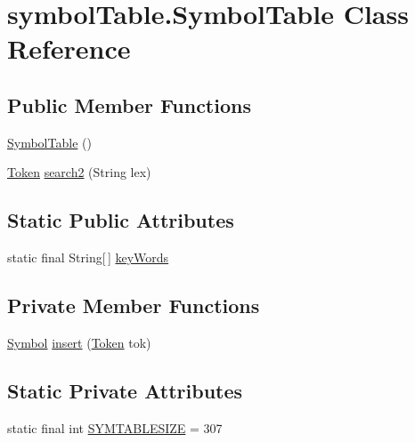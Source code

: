 \hypertarget{classsymbolTable_1_1SymbolTable}{}\section{symbol\+Table.\+Symbol\+Table Class Reference}
\label{classsymbolTable_1_1SymbolTable}
\subsection*{Public Member Functions}
\begin{DoxyCompactItemize}
\item 
\hyperlink{classsymbolTable_1_1SymbolTable_a1b4cd5dac1699204c1bd0cb5ff4aa30c}{Symbol\+Table} ()
\item 
\hyperlink{classscanner_1_1Token}{Token} \hyperlink{classsymbolTable_1_1SymbolTable_af54adba6eff2f27a21f6b6d9f2e5b44d}{search2} (String lex)
\end{DoxyCompactItemize}
\subsection*{Static Public Attributes}
\begin{DoxyCompactItemize}
\item 
static final String\mbox{[}$\,$\mbox{]} \hyperlink{classsymbolTable_1_1SymbolTable_a5f37608cbfd8c5327861b5b93bc3cb5d}{key\+Words}
\end{DoxyCompactItemize}
\subsection*{Private Member Functions}
\begin{DoxyCompactItemize}
\item 
\hyperlink{enumscanner_1_1Symbol}{Symbol} \hyperlink{classsymbolTable_1_1SymbolTable_a96c47c60308875f1fa63ebb0c028544c}{insert} (\hyperlink{classscanner_1_1Token}{Token} tok)
\end{DoxyCompactItemize}
\subsection*{Static Private Attributes}
\begin{DoxyCompactItemize}
\item 
static final int \hyperlink{classsymbolTable_1_1SymbolTable_a69fe7c75c051ced2de036b799e933d40}{S\+Y\+M\+T\+A\+B\+L\+E\+S\+I\+ZE} = 307
\end{DoxyCompactItemize}


